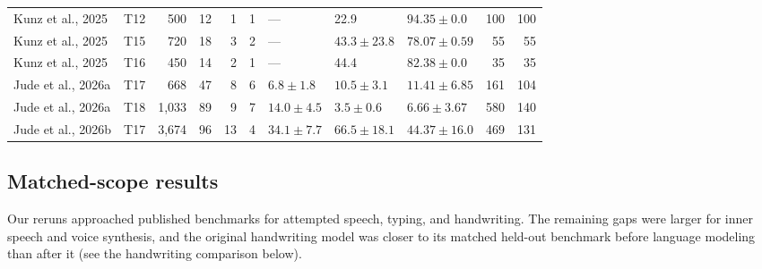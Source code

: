\documentclass[11pt]{article}
\begin{document}
\begin{table}[t]
\begin{tabular}{@{}>{\raggedright\arraybackslash}p{3.50cm}lrrrrlllrr@{}}
Kunz et al., 2025 \cite{kunz2025} & T12 & 500 & 12 & 1 & 1 & --- & 22.9 & $94.35{\pm}0.0$ & 100 & 100 \\
Kunz et al., 2025 \cite{kunz2025} & T15 & 720 & 18 & 3 & 2 & --- & $43.3{\pm}23.8$ & $78.07{\pm}0.59$ & 55 & 55 \\
Kunz et al., 2025 \cite{kunz2025} & T16 & 450 & 14 & 2 & 1 & --- & 44.4 & $82.38{\pm}0.0$ & 35 & 35 \\
Jude et al., 2026a \cite{jude2026typing} & T17 & 668 & 47 & 8 & 6 & $6.8{\pm}1.8$ & $10.5{\pm}3.1$ & $11.41{\pm}6.85$ & 161 & 104 \\
Jude et al., 2026a \cite{jude2026typing} & T18 & 1{,}033 & 89 & 9 & 7 & $14.0{\pm}4.5$ & $3.5{\pm}0.6$ & $6.66{\pm}3.67$ & 580 & 140 \\
Jude et al., 2026b \cite{jude2026lis} & T17 & 3{,}674 & 96 & 13 & 4 & $34.1{\pm}7.7$ & $66.5{\pm}18.1$ & $44.37{\pm}16.0$ & 469 & 131 \\
\bottomrule
\end{tabular}
\end{table}

\subsection{Matched-scope results}

Our reruns approached published benchmarks for attempted speech,
typing, and handwriting. The remaining gaps were larger for inner
speech and voice synthesis, and the original handwriting model was
closer to its matched held-out benchmark before language modeling than
after it (see the handwriting comparison below).
\end{document}

